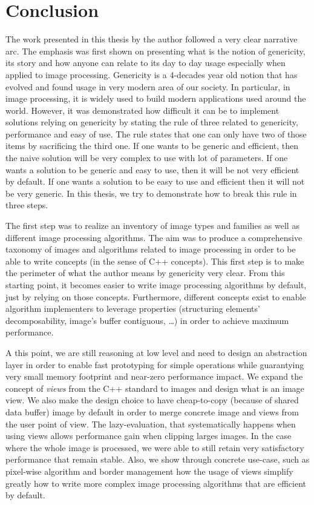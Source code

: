 \chapter{Conclusion}
\label{chap:conclusion}

The work presented in this thesis by the author followed a very clear narrative arc. The emphasis was first shown on
presenting what is the notion of genericity, its story and how anyone can relate to its day to day usage especially when
applied to image processing. Genericity is a 4-decades year old notion that has evolved and found usage in very modern
area of our society. In particular, in image processing, it is widely used to build modern applications used around the
world. However, it was demonstrated how difficult it can be to implement solutions relying on genericity by stating the
rule of three related to genericity, performance and easy of use. The rule states that one can only have two of those
items by sacrificing the third one. If one wants to be generic and efficient, then the naive solution will be very
complex to use with lot of parameters. If one wants a solution to be generic and easy to use, then it will be not very
efficient by default. If one wants a solution to be easy to use and efficient then it will not be very generic.
In this thesis, we try to demonstrate how to break this rule in three steps.

The first step was to realize an inventory of image types and families as well as different image processing algorithms.
The aim was to produce a comprehensive taxonomy of images and algorithms related to image processing in order to be able
to write concepts (in the sense of C++ concepts). This first step is to make the perimeter of what the author means by
genericity very clear. From this starting point, it becomes easier to write image processing algorithms by default, just
by relying on those concepts. Furthermore, different concepts exist to enable algorithm implementers to leverage
properties (structuring elements' decomposability, image's buffer contiguous, \ldots) in order to achieve maximum
performance.

A this point, we are still reasoning at low level and need to design an abstraction layer in order to enable fast
prototyping for simple operations while guarantying very small memory footprint and near-zero performance impact. We
expand the concept of \emph{views} from the C++ standard to images and design what is an image view. We also make the
design choice to have cheap-to-copy (because of shared data buffer) image by default in order to merge concrete image
and views from the user point of view. The lazy-evaluation, that systematically happens when using views allows
performance gain when clipping larges images. In the case where the whole image is processed, we were able to still
retain very satisfactory performance that remain stable. Also, we show through concrete use-case, such as pixel-wise
algorithm and border management how the usage of views simplify greatly how to write more complex image processing
algorithms that are efficient by default.

